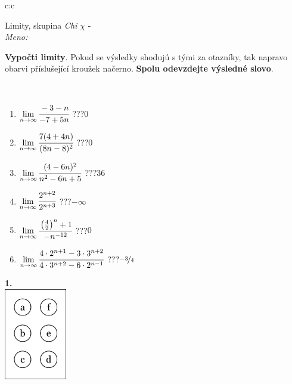 \documentclass[10pt]{report}
\begin{document}
\begin{tabular}{c:c}
\begin{minipage}[c][104.5mm][t]{0.5\linewidth}
\begin{center}
\vspace{7mm}
{\huge Limity, skupina \textit{Chi $\chi$} -}\\[5mm]
\textit{Meno:}\phantom{xxxxxxxxxxxxxxxxxxxxxxxxxxxxxxxxxxxxxxxxxxxxxxxxxxxxxxxxxxxxxxxxx}\\[5mm]
\begin{minipage}{0.95\linewidth}
\begin{center}
\textbf{Vypočti limity}. Pokud se výsledky shodujú s tými za otazníky, tak napravo\\obarvi příslušející kroužek načerno. \textbf{Spolu odevzdejte výsledné slovo}.
\end{center}
\end{minipage}
\\[1mm]
\begin{minipage}{0.79\linewidth}
\begin{center}
\begin{varwidth}{\linewidth}
\begin{enumerate}
\normalsize
\item $\lim\limits_{n\to\infty}\cfrac{-3-n}{-7+5n}$\quad \dotfill\; ???\;\dotfill \quad $0$
\item $\lim\limits_{n\to\infty}\cfrac{7(4+4n)}{(8n-8)^2}$\quad \dotfill\; ???\;\dotfill \quad $0$
\item $\lim\limits_{n\to\infty}\cfrac{(4-6n)^2}{n^2-6n+5}$\quad \dotfill\; ???\;\dotfill \quad $36$
\item $\lim\limits_{n\to\infty}\cfrac{2^{n+2}}{2^{n+3}}$\quad \dotfill\; ???\;\dotfill \quad $-\infty$
\item $\lim\limits_{n\to\infty}\cfrac{\left(\frac{4}{2}\right)^n +1}{-n^{-12}}$\quad \dotfill\; ???\;\dotfill \quad $0$
\item $\lim\limits_{n\to\infty}\cfrac{4\cdot 2^{n+1}-3\cdot 3^{n+2}}{4\cdot 3^{n+2}-6\cdot 2^{n-1}}$\quad \dotfill\; ???\;\dotfill \quad $\nicefrac{-3}{4}$
\end{enumerate}
\end{varwidth}
\end{center}
\end{minipage}
\begin{minipage}{0.20\linewidth}
\begin{center}
{\Huge\bfseries 1.} \\[2mm]
\includegraphics[height=40mm]{../images/braille.png}

\end{center}
\end{minipage}
\end{center}
\end{minipage}
\end{tabular}
\end{document}
